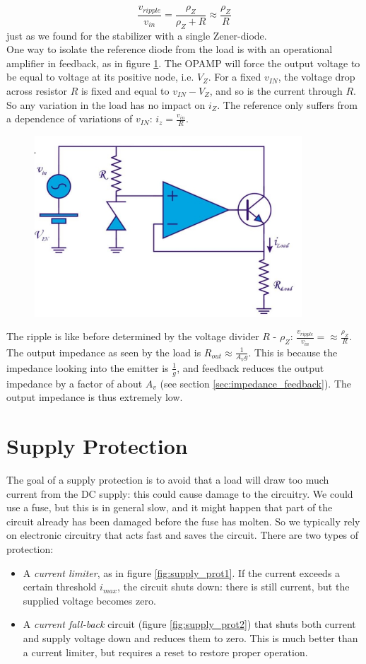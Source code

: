 $$
\frac{v_{ripple}}{v_{in}} = \frac{\rho_Z}{\rho_Z + R} \approx \frac{\rho_Z}{R}
$$
just as we found for the stabilizer with a single Zener-diode.\\
One way to isolate the reference diode from the load is with an operational amplifier in feedback, as in figure \ref{fig:stabilizer9}. The OPAMP will force the output voltage to be equal to voltage at its positive node, i.e. $V_Z$. For a fixed $v_{IN}$, the voltage drop across resistor $R$ is fixed and equal to $v_{IN} - V_Z$, and so is the current through $R$. So any variation in the load has no impact on  $i_Z$. The reference only suffers from a dependence of variations of $v_{IN}$: $i_z = \frac{v_{in}}{R}$.
\begin{figure}[h!]
	\centering
	\includegraphics[width=10cm]{figures/ch12/stabilizer9.jpg}
	\caption{}
	\label{fig:stabilizer9}
\end{figure}
The ripple is like before determined by the voltage divider $R$ - $\rho_Z$: $\frac{v_{ripple}}{v_{in}} = \approx \frac{\rho_Z}{R}$. The output impedance as seen by the load is $R_{out} \approx \frac{1}{A_V g}$. This is because the impedance looking into the emitter is $\frac{1}{g}$, and feedback reduces the output impedance by a factor of about $A_v$ (see section \ref{sec:impedance_feedback}). The output impedance is thus extremely low.

\section{Supply Protection}

The goal of a supply protection is to avoid that a load will draw too much current from the DC supply: this could cause damage to the circuitry. We could use a fuse, but this is in general slow, and it might happen that part of the circuit already has been damaged before the fuse has molten. So we typically rely on electronic circuitry that acts fast and saves the circuit. There are two types of protection:
\begin{itemize}
	\item A \emph{current limiter}, as in figure \ref{fig:supply_prot1}. If the current exceeds a certain threshold $i_{max}$, the circuit shuts down: there is still current, but the supplied voltage becomes zero.
	\item A \emph{current fall-back} circuit (figure \ref{fig:supply_prot2}) that shuts both current and supply voltage down and reduces them to zero. This is much better than a current limiter, but requires a reset to restore proper operation.
\end{itemize}

